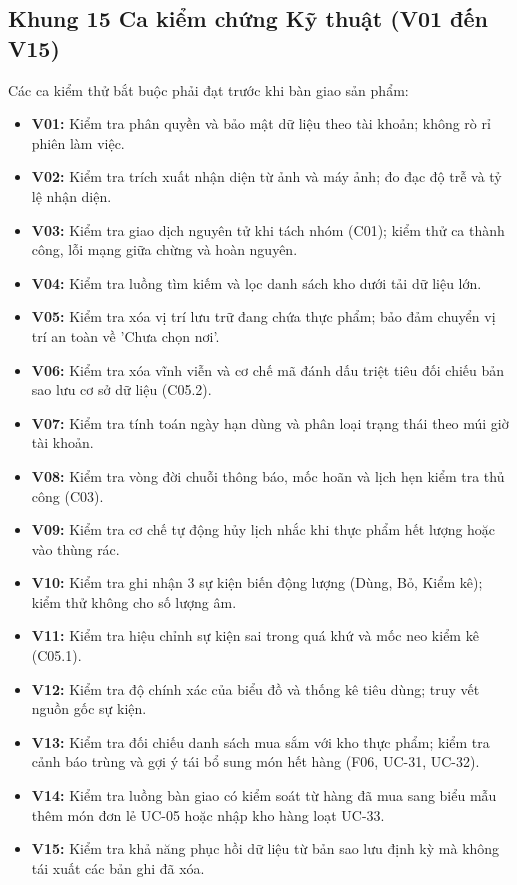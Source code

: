 \documentclass[10pt,a4paper]{article}
\begin{document}
\subsection{Khung 15 Ca kiểm chứng Kỹ thuật (V01 đến V15)}
Các ca kiểm thử bắt buộc phải đạt trước khi bàn giao sản phẩm:
\begin{itemize}[itemsep=2pt]
    \item \textbf{V01:} Kiểm tra phân quyền và bảo mật dữ liệu theo tài khoản; không rò rỉ phiên làm việc.
    \item \textbf{V02:} Kiểm tra trích xuất nhận diện từ ảnh và máy ảnh; đo đạc độ trễ và tỷ lệ nhận diện.
    \item \textbf{V03:} Kiểm tra giao dịch nguyên tử khi tách nhóm (C01); kiểm thử ca thành công, lỗi mạng giữa chừng và hoàn nguyên.
    \item \textbf{V04:} Kiểm tra luồng tìm kiếm và lọc danh sách kho dưới tải dữ liệu lớn.
    \item \textbf{V05:} Kiểm tra xóa vị trí lưu trữ đang chứa thực phẩm; bảo đảm chuyển vị trí an toàn về 'Chưa chọn nơi'.
    \item \textbf{V06:} Kiểm tra xóa vĩnh viễn và cơ chế mã đánh dấu triệt tiêu đối chiếu bản sao lưu cơ sở dữ liệu (C05.2).
    \item \textbf{V07:} Kiểm tra tính toán ngày hạn dùng và phân loại trạng thái theo múi giờ tài khoản.
    \item \textbf{V08:} Kiểm tra vòng đời chuỗi thông báo, mốc hoãn và lịch hẹn kiểm tra thủ công (C03).
    \item \textbf{V09:} Kiểm tra cơ chế tự động hủy lịch nhắc khi thực phẩm hết lượng hoặc vào thùng rác.
    \item \textbf{V10:} Kiểm tra ghi nhận 3 sự kiện biến động lượng (Dùng, Bỏ, Kiểm kê); kiểm thử không cho số lượng âm.
    \item \textbf{V11:} Kiểm tra hiệu chỉnh sự kiện sai trong quá khứ và mốc neo kiểm kê (C05.1).
    \item \textbf{V12:} Kiểm tra độ chính xác của biểu đồ và thống kê tiêu dùng; truy vết nguồn gốc sự kiện.
    \item \textbf{V13:} Kiểm tra đối chiếu danh sách mua sắm với kho thực phẩm; kiểm tra cảnh báo trùng và gợi ý tái bổ sung món hết hàng (F06, UC-31, UC-32).
    \item \textbf{V14:} Kiểm tra luồng bàn giao có kiểm soát từ hàng đã mua sang biểu mẫu thêm món đơn lẻ UC-05 hoặc nhập kho hàng loạt UC-33.
    \item \textbf{V15:} Kiểm tra khả năng phục hồi dữ liệu từ bản sao lưu định kỳ mà không tái xuất các bản ghi đã xóa.
\end{itemize}
\end{document}
